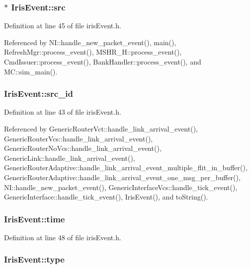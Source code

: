 \subsubsection[{src}]{$\ast$ {\bf IrisEvent::src}}\label{classIrisEvent_faceee3f43e187f63e699c17477df744}




Definition at line 45 of file irisEvent.h.

Referenced by NI::handle\_\-new\_\-packet\_\-event(), main(), RefreshMgr::process\_\-event(), MSHR\_\-H::process\_\-event(), CmdIssuer::process\_\-event(), BankHandler::process\_\-event(), and MC::sim\_\-main().
\subsubsection[{src\_\-id}]{ {\bf IrisEvent::src\_\-id}}\label{classIrisEvent_0ea5ae351f3d7dba0a5ad697a7928754}




Definition at line 43 of file irisEvent.h.

Referenced by GenericRouterVct::handle\_\-link\_\-arrival\_\-event(), GenericRouterVcs::handle\_\-link\_\-arrival\_\-event(), GenericRouterNoVcs::handle\_\-link\_\-arrival\_\-event(), GenericLink::handle\_\-link\_\-arrival\_\-event(), GenericRouterAdaptive::handle\_\-link\_\-arrival\_\-event\_\-multiple\_\-flit\_\-in\_\-buffer(), GenericRouterAdaptive::handle\_\-link\_\-arrival\_\-event\_\-one\_\-msg\_\-per\_\-buffer(), NI::handle\_\-new\_\-packet\_\-event(), GenericInterfaceVcs::handle\_\-tick\_\-event(), GenericInterface::handle\_\-tick\_\-event(), IrisEvent(), and toString().
\subsubsection[{time}]{ {\bf IrisEvent::time}}\label{classIrisEvent_cd8c9add4afdbc69bf7dbcaf8a61ba01}




Definition at line 48 of file irisEvent.h.
\subsubsection[{type}]{ {\bf IrisEvent::type}}\label{classIrisEvent_339423ccde297a9d2f4ad3e06fc28030}




